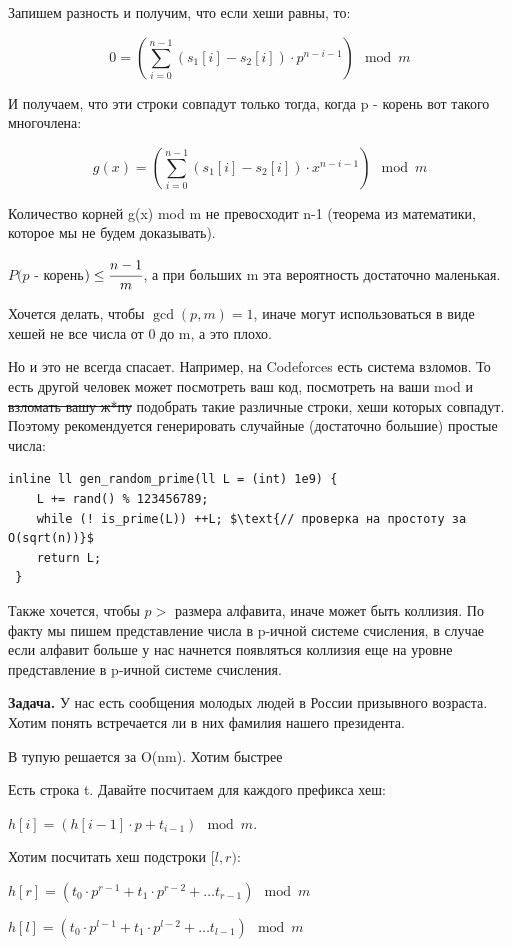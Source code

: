 \documentclass{article}
\begin{document}
Запишем разность и получим, что если хеши равны, то: 

\[0 =(\sum\limits_{i=0}^{n-1}(s_1[i]-s_2[i])\cdot p^{n-i-1}) \mod m\]

И получаем, что эти строки совпадут только тогда, когда p - корень вот такого многочлена:

\[g(x) =(\sum\limits_{i=0}^{n-1}(s_1[i]-s_2[i])\cdot x^{n-i-1}) \mod m\] 

Количество корней g(x) mod m не превосходит n-1 (теорема из математики, которое мы не будем доказывать).

$P(p$ - корень$) \leq \cfrac{n-1}{m}$,  а при больших m эта вероятность достаточно маленькая.

Хочется делать, чтобы $\gcd(p,m) = 1$, иначе могут использоваться в виде хешей не все числа от 0 до m, а это плохо.

Но и это не всегда спасает. Например, на Codeforces есть система взломов. То есть другой человек может посмотреть ваш код, посмотреть на ваши mod  и \sout{взломать вашу ж*пу} подобрать такие различные
строки, хеши которых совпадут. Поэтому рекомендуется генерировать случайные (достаточно большие) простые числа: 

\begin{lstlisting}[mathescape] 
 inline ll gen_random_prime(ll L = (int) 1e9) {
    L += rand() % 123456789;
    while (! is_prime(L)) ++L; $\text{// проверка на простоту за O(sqrt(n))}$
    return L;
 }
 \end{lstlisting}

Также хочется, чтобы $p>$ размера алфавита, иначе может быть коллизия. По факту мы пишем представление числа в p-ичной системе счисления, в случае если алфавит больше у нас начнется появляться коллизия еще на уровне представление в p-ичной системе счисления.

\textbf{Задача.} У нас есть сообщения молодых людей в России призывного возраста. Хотим понять встречается ли в них фамилия нашего президента. 

В тупую решается за O(nm). Хотим быстрее

Есть строка t. Давайте посчитаем для каждого префикса хеш:

$h[i] =(h[i-1]\cdot p +t_{i-1}) \mod m$.

Хотим посчитать  хеш подстроки $[l,r)$:

$h[r] = (t_0 \cdot p^{r-1} + t_1 \cdot p^{r-2} + \ldots t_{r-1}) \mod m$

$h[l] =(t_0 \cdot p^{l-1} + t_1 \cdot p^{l-2} + \ldots t_{l-1}) \mod m$
\end{document}
